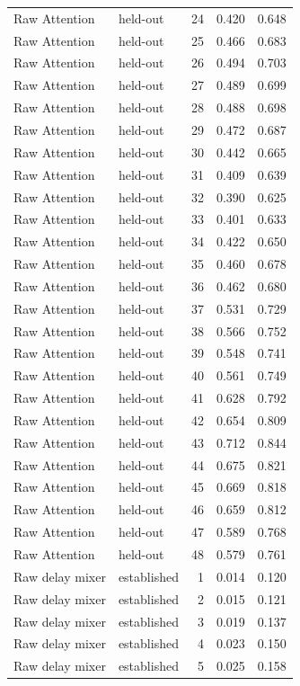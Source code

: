 \begin{tabular}{llrrr}
Raw Attention & held-out & 24 & 0.420 & 0.648 \\
Raw Attention & held-out & 25 & 0.466 & 0.683 \\
Raw Attention & held-out & 26 & 0.494 & 0.703 \\
Raw Attention & held-out & 27 & 0.489 & 0.699 \\
Raw Attention & held-out & 28 & 0.488 & 0.698 \\
Raw Attention & held-out & 29 & 0.472 & 0.687 \\
Raw Attention & held-out & 30 & 0.442 & 0.665 \\
Raw Attention & held-out & 31 & 0.409 & 0.639 \\
Raw Attention & held-out & 32 & 0.390 & 0.625 \\
Raw Attention & held-out & 33 & 0.401 & 0.633 \\
Raw Attention & held-out & 34 & 0.422 & 0.650 \\
Raw Attention & held-out & 35 & 0.460 & 0.678 \\
Raw Attention & held-out & 36 & 0.462 & 0.680 \\
Raw Attention & held-out & 37 & 0.531 & 0.729 \\
Raw Attention & held-out & 38 & 0.566 & 0.752 \\
Raw Attention & held-out & 39 & 0.548 & 0.741 \\
Raw Attention & held-out & 40 & 0.561 & 0.749 \\
Raw Attention & held-out & 41 & 0.628 & 0.792 \\
Raw Attention & held-out & 42 & 0.654 & 0.809 \\
Raw Attention & held-out & 43 & 0.712 & 0.844 \\
Raw Attention & held-out & 44 & 0.675 & 0.821 \\
Raw Attention & held-out & 45 & 0.669 & 0.818 \\
Raw Attention & held-out & 46 & 0.659 & 0.812 \\
Raw Attention & held-out & 47 & 0.589 & 0.768 \\
Raw Attention & held-out & 48 & 0.579 & 0.761 \\
Raw delay mixer & established & 1 & 0.014 & 0.120 \\
Raw delay mixer & established & 2 & 0.015 & 0.121 \\
Raw delay mixer & established & 3 & 0.019 & 0.137 \\
Raw delay mixer & established & 4 & 0.023 & 0.150 \\
Raw delay mixer & established & 5 & 0.025 & 0.158 \\

\end{tabular}
